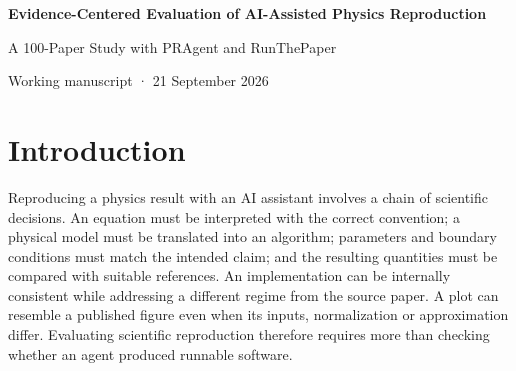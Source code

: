 \documentclass[10pt,a4paper]{article}
\begin{document}
\begin{center}
{\LARGE\bfseries Evidence-Centered Evaluation of AI-Assisted Physics
Reproduction\par}
\vspace{6pt}
{\large A 100-Paper Study with PRAgent and RunThePaper\par}
\vspace{9pt}
{\small Working manuscript · 21 September 2026\par}
\end{center}
\vspace{3pt}
\begin{abstract}
AI-assisted scientific reproduction requires evidence that an implementation addresses the physical object, conditions and claim of a source paper. Code availability or a plausible plot alone does not establish this correspondence. We present an evidence-centered evaluation protocol and apply its public-record audit to a fixed cohort of 100 physics papers. At the analysis cutoff, standardized public records were available for 97 cohort members. The audit preserves 3,666 source-inventory entries and recovers 261 unlinked execution-target records, with integrity metadata for 1,721 input files. Although 97 papers have public Python files and 96 have public data files, 88 contain unresolved public references and 47 contain targets not linked to their source inventories. At record level, 2,114 entries simultaneously link to public artifacts and contain unresolved references, demonstrating that artifact availability and evidentiary completeness measure different properties. We distinguish source coverage, physical fidelity, numerical agreement and review finality, and illustrate their implications for entanglement, spin transport and lattice topology. These results characterize the inspectability of a scientific archive; they do not estimate reproduction success. The study provides a unified cohort, a reproducible audit and a structured basis for subsequent independent scientific assessment.
\end{abstract}

\section{Introduction}\label{introduction}

Reproducing a physics result with an AI assistant involves a chain of
scientific decisions. An equation must be interpreted with the correct
convention; a physical model must be translated into an algorithm;
parameters and boundary conditions must match the intended claim; and
the resulting quantities must be compared with suitable references. An
implementation can be internally consistent while addressing a different
regime from the source paper. A plot can resemble a published figure
even when its inputs, normalization or approximation differ. Evaluating
scientific reproduction therefore requires more than checking whether an
agent produced runnable software.
\end{document}
